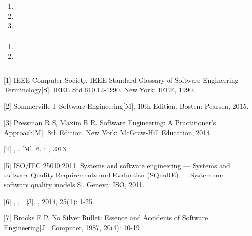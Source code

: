 \subsubsection{}\label{section-12}

\begin{enumerate}
\def\labelenumi{\arabic{enumi}.}
\tightlist
\item
\item
\item
\end{enumerate}

\subsubsection{}\label{section-13}

\begin{enumerate}
\def\labelenumi{\arabic{enumi}.}
\tightlist
\item
\item
\end{enumerate}

\subsection{}\label{section-14}

\subsection{}\label{section-15}

{[}1{]} IEEE Computer Society. IEEE Standard Glossary of Software
Engineering Terminology{[}S{]}. IEEE Std 610.12-1990. New York: IEEE,
1990.

{[}2{]} Sommerville I. Software Engineering{[}M{]}. 10th Edition.
Boston: Pearson, 2015.

{[}3{]} Pressman R S, Maxim B R. Software Engineering: A Practitioner's
Approach{[}M{]}. 8th Edition. New York: McGraw-Hill Education, 2014.

{[}4{]} , . {[}M{]}. 6. : , 2013.

{[}5{]} ISO/IEC 25010:2011. Systems and software engineering --- Systems
and software Quality Requirements and Evaluation (SQuaRE) --- System and
software quality models{[}S{]}. Geneva: ISO, 2011.

{[}6{]} , , . {[}J{]}. , 2014, 25(1): 1-25.

{[}7{]} Brooks F P. No Silver Bullet: Essence and Accidents of Software
Engineering{[}J{]}. Computer, 1987, 20(4): 10-19.

